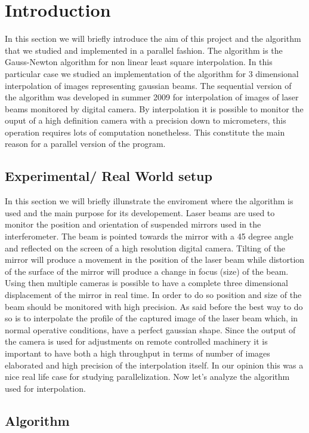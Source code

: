 \section{Introduction}  

In this section we will briefly introduce the aim of this project and the algorithm that we studied and implemented in a parallel fashion.
The algorithm is the Gauss-Newton algorithm for non linear least square interpolation.
In this particular case we studied an implementation of the algorithm for 3 dimensional interpolation of images representing gaussian beams.
The sequential version of the algorithm was developed in summer 2009 for interpolation of images of laser beams monitored by digital camera. 
By interpolation it is possible to monitor the ouput of a high definition camera with a precision down to micrometers, this operation requires lots of computation nonetheless.
This constitute the main reason for a parallel version of the program.

\subsection{Experimental/ Real World setup}

In this section we will briefly illunstrate the enviroment where the algorithm is used and the main purpose for its developement.
Laser beams are used to monitor the position and orientation of suspended mirrors used in the interferometer. 
The beam is pointed towards the mirror with a 45 degree angle and reflected on the screen of a high resolution digital camera.
Tilting of the mirror will produce a movement in the position of the laser beam while distortion of the surface of the mirror will produce a change in focus (size) of the beam.
Using then multiple cameras is possible to have a complete three dimensional displacement of the mirror in real time.
In order to do so position and size of the beam should be monitored with high precision. 
As said before the best way to do so is to interpolate the profile of the captured image of the laser beam which, in normal operative conditions, have a perfect gaussian shape.
Since the output of the camera is used for adjustments on remote controlled machinery it is important to have both a high throughput in terms of number of images elaborated and high precision of the interpolation itself.
In our opinion this was a nice real life case for studying parallelization.
Now let's analyze the algorithm used for interpolation.

\subsection{Algorithm}

